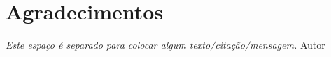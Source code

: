 \documentclass[12pt,oneside]{book} %
\begin{document}





    \chapter*{Agradecimentos}
    \thispagestyle{empty}










    \newpage
    \thispagestyle{empty}

    \begin{flushright}
        \begin{minipage}{5cm}
            \begin{flushright}
                \vspace{23cm}\textit{Este espaço é separado para colocar algum texto/citação/mensagem.}
                \vspace{0.2cm}Autor
            \end{flushright}
        \end{minipage}
    \end{flushright}
\end{document}
